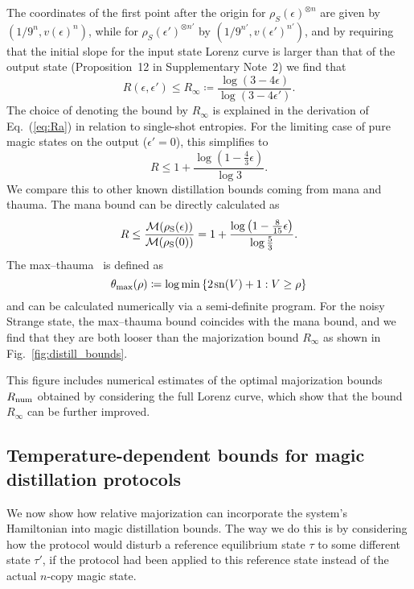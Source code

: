 \documentclass[
onecolumn,
superscriptaddress
]{revtex4-1}
\def\M{{\cal M}}
\begin{document}
The coordinates of the first point after the origin for $\rho_S(\epsilon)^{\otimes n}$ are given by $(1/9^n, v(\epsilon)^n)$, while for $\rho_S(\epsilon')^{\otimes n'}$ by $(1/9^{n'}, v(\epsilon')^{n'})$, and by requiring that the initial slope for the input state Lorenz curve is larger than that of the output state (Proposition~12 in Supplementary Note~2) we find that
\begin{equation}\label{eq:unital-bound}
	R(\epsilon, \epsilon') \leq R_\infty \coloneqq\frac{\log (3-4\epsilon)}{\log (3-4\epsilon')}.
\end{equation}
The choice of denoting the bound by $R_\infty$ is explained in the derivation of Eq.~(\ref{eq:Ra}) in relation to single-shot entropies. For the limiting case of pure magic states on the output ($\epsilon'=0$), this simplifies to
\begin{equation}
	R \leq 1 + \frac{\log (1 - \frac{4}{3} \epsilon)}{\log 3}.
\end{equation}
We compare this to other known distillation bounds coming from mana and thauma. The mana bound can be directly calculated as
\begin{equation}
	R \leq \frac{\M(\rho_{\rm{S}}(\epsilon))}{\M(\rho_{\rm{S}}(0))} = 1 + \frac{\log \left(1 - \frac{8}{15}\epsilon \right)}{\log \frac{5}{3}}.
\end{equation}
The max--thauma~\cite{Wang_2020} is defined as
\begin{equation}
	\theta_{\rm{max}}(\rho) \coloneqq \log \min{\{2\hspace{1pt}{\rm sn}(V)+1 : V \geq \rho\}}
\end{equation}
and can be calculated numerically via a semi-definite program. For the noisy Strange state, the max--thauma bound coincides with the mana bound, and we find that they are both looser than the majorization bound $R_\infty$ as shown in Fig.~\ref{fig:distill_bounds}. 

This figure includes numerical estimates of the optimal majorization bounds $R_{\rm{num}}$ obtained by considering the full Lorenz curve, which show that the bound $R_\infty$ can be further improved.

\subsection*{Temperature-dependent bounds for magic distillation protocols}

We now show how relative majorization can incorporate the system's Hamiltonian into magic distillation bounds. The way we do this is by considering how the protocol would disturb a reference equilibrium state $\tau$ to some different state $\tau'$, if the protocol had been applied to this reference state instead of the actual $n$-copy magic state. 
\end{document}
